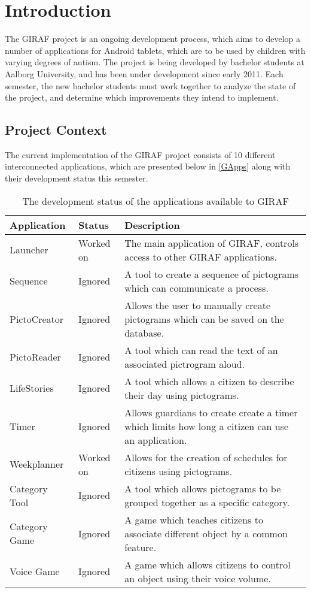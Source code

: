 \chapter{Introduction}
The GIRAF project is an ongoing development process, which aims to develop a
number of applications for Android tablets, which are to be used by children
with varying degrees of autism. The project is being developed by bachelor
students at Aalborg University, and has been under development since early 2011.
Each semester, the new bachelor students must work together to analyze the state
of the project, and determine which improvements they intend to implement.

\section{Project Context}

The current implementation of the GIRAF project consists of 10 different
interconnected applications, which are presented below in \autoref{GApps} along
with their development status this semester.

\begin{table}[H]
\centering
\begin{tabular}{|p{2.8cm}|p{2.2cm}|p{7cm}|}
\hline
Application			& Status & Description \\\hline
Launcher  			& Worked on & The main application of GIRAF, controls access
to other GIRAF applications. \\\hline 
Sequence	       	& Ignored & A tool to create a sequence of pictograms which can
communicate a process.\\\hline 
PictoCreator  	   	& Ignored & Allows the user to manually create pictograms
which can be saved on the database.\\\hline
PictoReader	   		& Ignored & A tool which can read the text of an associated
pictrogram aloud.\\\hline
LifeStories	   		& Ignored & A tool which allows a citizen to describe their day
using pictograms.\\\hline 
Timer     	   		& Ignored & Allows guardians to create create a timer which
limits how long a citizen can use an application.\\\hline 
Weekplanner 		& Worked on & Allows for the creation of schedules for citizens
using pictograms. \\\hline 
Category Tool		& Ignored & A tool which allows pictograms to be grouped together
as a specific category. \\\hline 
Category Game   	& Ignored & A game which teaches citizens to associate
different object by a common feature. \\\hline 
Voice Game  		& Ignored & A game which allows citizens to control an object
using their voice volume. \\\hline
\end{tabular} 
\caption{The development status of the applications available to GIRAF}
\label{GApps}
\end{table}

